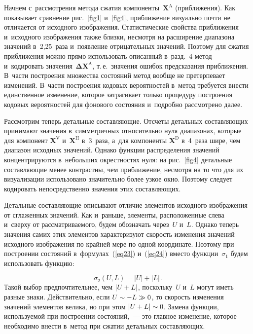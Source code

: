 \begin{multicols}{2}
Начнем с~рассмотрения метода сжатия компоненты~$\mathbf{X}^{\mathrm{A}}$ (приближения). 
Как показывает сравнение рис.~\ref{fig1} и~\ref{fig4}, приближение визуально 
почти не отличается от исходного изоб\-ра\-же\-ния. Стати\-стические свойства приближения 
и~исходного изоб\-ра\-же\-ния также близки, несмотря на расширение диапазона значений 
в~2,25~раза и~появление отрицательных значений. Поэтому для сжатия 
приближения можно прямо использовать описанный в~разд.~4 
метод и~кодировать значения~$\boldsymbol{\Delta}\mathbf{X}^{\mathrm{A}}$, т.\,е.\
значения ошибок предсказания приближения. В~час\-ти построения множества состояний 
метод вообще не претерпевает изменений. В~час\-ти по\-стро\-ения кодовых вероятностей в~метод 
требуется внести единственное изменение, которое затрагивает только процедуру 
по\-стро\-ения кодовых вероятностей для фонового со\-сто\-яния и~подробно рассмотрено далее.
{ %

}

Рассмотрим теперь детальные составляющие. Отсчеты детальных составляющих 
принимают значения в~симметричных относительно нуля диапазонах, которые 
для компонент  $\mathbf{X}^{\mathrm{V}}$ и~$\mathbf{X}^{\mathrm{H}}$ в~3~раза, 
а~для компоненты $\mathbf{X}^{\mathrm{D}}$ в~4~раза шире, чем 
диапазон исходных значений. Однако функции распределения значений концентрируются 
в~небольших окрестностях нуля: на рис.~\ref{fig4} детальные составляющие менее 
контрастны, чем приближение, несмотря на то что для их визуализации использовано 
значительно более узкое окно. Поэтому следует кодировать непосредственно значения 
этих составляющих.

Детальные составляющие описывают отличие элементов исходного изображения 
от сглаженных значений. Как и~раньше, элементы, расположенные слева и~сверху 
от рассматриваемого, будем обозначать через~$U$ и~$L$. Однако теперь значения 
самих этих элементов характеризуют скорость изменения значений исходного 
изображения по крайней мере по одной координате. Поэтому при построении 
состояний в~формулах~(\ref{eq23}) и~(\ref{eq24}) вместо функции~$\sigma_1$ будем 
использовать функцию:

\vspace*{3pt}

\noindent
\begin{equation}
\label{eq37}
\sigma_2(U,L) = |U|+|L|\,.
\end{equation}
Такой выбор предпочтительнее, чем $|U\hm+L|$, поскольку~$U$ и~$L$ 
могут иметь разные знаки. Действительно, если  $U\hm\sim -L \hm\gg 0$, то скорость 
изменения значений элементов велика, но при этом $|U\hm+L|\hm\sim 0$. Замена функции, 
используемой при по\-стро\-ении состояний,~--- 
это главное изменение, которое необходимо внести в~метод при сжатии детальных 
составляющих.


\end{multicols}
